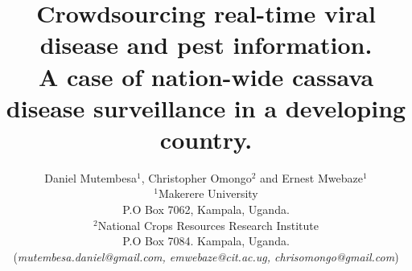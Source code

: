 \documentclass[letterpaper]{article} %
\begin{document}
%

\title{Crowdsourcing real-time viral disease and pest information.\\
A case of nation-wide cassava disease surveillance in a developing country.}
\author{Daniel Mutembesa$^{1}$, Christopher Omongo$^{2}$ and Ernest Mwebaze$^{1}$\\
$^{1}$Makerere University\\
P.O Box 7062, Kampala, Uganda.\\
$^{2}$National Crops Resources Research Institute\\ P.O Box 7084. Kampala, Uganda.\\
(\emph{mutembesa.daniel@gmail.com, emwebaze@cit.ac.ug, chrisomongo@gmail.com})
}
\end{document}

